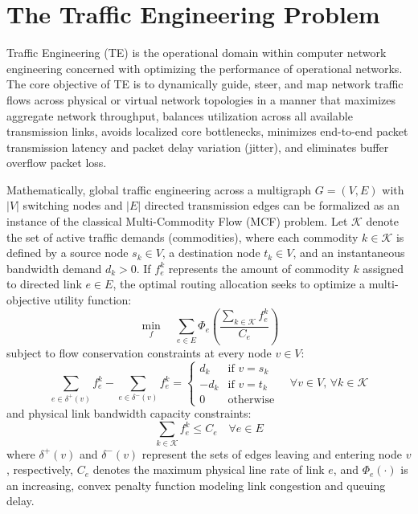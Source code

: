 \section{The Traffic Engineering Problem}
Traffic Engineering (TE) is the operational domain within computer network engineering concerned with optimizing the performance of operational networks. The core objective of TE is to dynamically guide, steer, and map network traffic flows across physical or virtual network topologies in a manner that maximizes aggregate network throughput, balances utilization across all available transmission links, avoids localized core bottlenecks, minimizes end-to-end packet transmission latency and packet delay variation (jitter), and eliminates buffer overflow packet loss.

Mathematically, global traffic engineering across a multigraph $G = (V, E)$ with $|V|$ switching nodes and $|E|$ directed transmission edges can be formalized as an instance of the classical Multi-Commodity Flow (MCF) problem. Let $\mathcal{K}$ denote the set of active traffic demands (commodities), where each commodity $k \in \mathcal{K}$ is defined by a source node $s_k \in V$, a destination node $t_k \in V$, and an instantaneous bandwidth demand $d_k > 0$. If $f_e^k$ represents the amount of commodity $k$ assigned to directed link $e \in E$, the optimal routing allocation seeks to optimize a multi-objective utility function:
\begin{equation}
    \min_{f} \quad \sum_{e \in E} \Phi_e\left( \frac{\sum_{k \in \mathcal{K}} f_e^k}{C_e} \right)
    \label{eq:te_general_objective}
\end{equation}
subject to flow conservation constraints at every node $v \in V$:
\begin{equation}
    \sum_{e \in \delta^+(v)} f_e^k - \sum_{e \in \delta^-(v)} f_e^k = \begin{cases}
        d_k & \text{if } v = s_k \\
        -d_k & \text{if } v = t_k \\
        0 & \text{otherwise}
    \end{cases} \quad \forall v \in V, \, \forall k \in \mathcal{K}
    \label{eq:flow_conservation_intro}
\end{equation}
and physical link bandwidth capacity constraints:
\begin{equation}
    \sum_{k \in \mathcal{K}} f_e^k \le C_e \quad \forall e \in E
    \label{eq:capacity_constraint_intro}
\end{equation}
where $\delta^+(v)$ and $\delta^-(v)$ represent the sets of edges leaving and entering node $v$, respectively, $C_e$ denotes the maximum physical line rate of link $e$, and $\Phi_e(\cdot)$ is an increasing, convex penalty function modeling link congestion and queuing delay.

